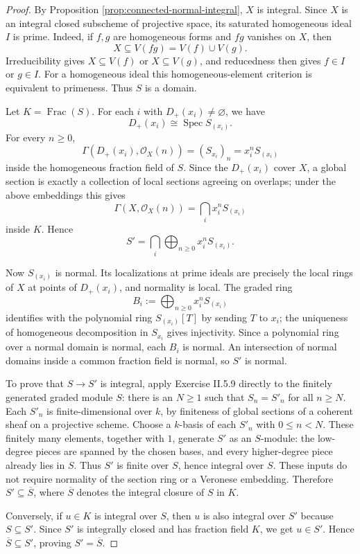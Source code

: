 \documentclass[11pt]{amsart}
\DeclareMathOperator{\Spec}{Spec}
\DeclareMathOperator{\Frac}{Frac}
\newcommand{\OO}{\mathcal O}
\theoremstyle{plain}
\theoremstyle{definition}
\theoremstyle{remark}
\begin{document}
\begin{proof}
By Proposition \ref{prop:connected-normal-integral}, $X$ is integral.  Since $X$ is an integral closed subscheme of projective space, its saturated homogeneous ideal $I$ is prime.  Indeed, if $f,g$ are homogeneous forms and $fg$ vanishes on $X$, then
\[
  X \subseteq V(fg) = V(f)\cup V(g).
\]
Irreducibility gives $X\subseteq V(f)$ or $X\subseteq V(g)$, and reducedness then gives $f\in I$ or $g\in I$.  For a homogeneous ideal this homogeneous-element criterion is equivalent to primeness.  Thus $S$ is a domain.

Let $K=\Frac(S)$.  For each $i$ with $D_+(x_i)\neq\varnothing$, we have
\[
  D_+(x_i) \cong \Spec S_{(x_i)}.
\]
For every $n\geq 0$,
\[
  \Gamma(D_+(x_i),\OO_X(n)) = (S_{x_i})_n = x_i^nS_{(x_i)}
\]
inside the homogeneous fraction field of $S$.  Since the $D_+(x_i)$ cover $X$, a global section is exactly a collection of local sections agreeing on overlaps; under the above embeddings this gives
\[
  \Gamma(X,\OO_X(n))
  = \bigcap_i x_i^n S_{(x_i)}
\]
inside $K$.  Hence
\[
  S' = \bigcap_i \bigoplus_{n\geq 0} x_i^nS_{(x_i)}.
\]

Now $S_{(x_i)}$ is normal.  Its localizations at prime ideals are precisely the local rings of $X$ at points of $D_+(x_i)$, and normality is local.  The graded ring
\[
  B_i := \bigoplus_{n\geq 0}x_i^nS_{(x_i)}
\]
identifies with the polynomial ring $S_{(x_i)}[T]$ by sending $T$ to $x_i$; the uniqueness of homogeneous decomposition in $S_{x_i}$ gives injectivity.  Since a polynomial ring over a normal domain is normal, each $B_i$ is normal.  An intersection of normal domains inside a common fraction field is normal, so $S'$ is normal.

To prove that $S\to S'$ is integral, apply Exercise II.5.9 directly to the finitely generated graded module $S$: there is an $N\geq 1$ such that $S_n=S'_n$ for all $n\geq N$. Each $S'_n$ is finite-dimensional over $k$, by finiteness of global sections of a coherent sheaf on a projective scheme. Choose a $k$-basis of each $S'_n$ with $0\leq n<N$. These finitely many elements, together with $1$, generate $S'$ as an $S$-module: the low-degree pieces are spanned by the chosen bases, and every higher-degree piece already lies in $S$. Thus $S'$ is finite over $S$, hence integral over $S$. These inputs do not require normality of the section ring or a Veronese embedding. Therefore $S'\subseteq \overline S$, where $\overline S$ denotes the integral closure of $S$ in $K$.

Conversely, if $u\in K$ is integral over $S$, then $u$ is also integral over $S'$ because $S\subseteq S'$.  Since $S'$ is integrally closed and has fraction field $K$, we get $u\in S'$.  Hence $\overline S\subseteq S'$, proving $S'=\overline S$.
\end{proof}
\end{document}
